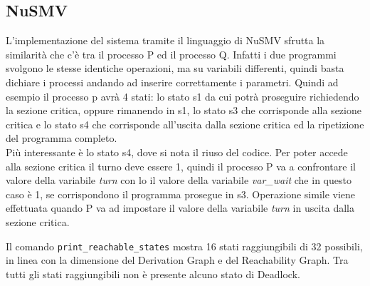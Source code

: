 \documentclass[a4paper]{article}
\begin{document}
\subsection{NuSMV}
L'implementazione del sistema tramite il linguaggio di NuSMV sfrutta la similarità che c'è tra il processo P ed il processo Q.
Infatti i due programmi svolgono le stesse identiche operazioni, ma su variabili differenti, quindi basta dichiare i processi andando ad inserire correttamente i parametri.
Quindi ad esempio il processo p avrà 4 stati: lo stato s1 da cui potrà proseguire richiedendo la sezione critica, oppure rimanendo in s1, lo stato s3 che corrisponde alla sezione critica e lo stato s4 che corrisponde all'uscita dalla sezione critica ed la ripetizione del programma completo.\\
Più interessante è lo stato s4, dove si nota il riuso del codice. 
Per poter accede alla sezione critica il turno deve essere 1, quindi il processo P va a confrontare il valore della variabile \textit{turn} con lo il valore della variabile \textit{var\_wait} che in questo caso è 1, se corrispondono il programma prosegue in s3.
Operazione simile viene effettuata quando P va ad impostare il valore della variabile \textit{turn} in uscita dalla sezione critica.

Il comando \texttt{print\_reachable\_states} mostra 16 stati raggiungibili di 32 possibili, in linea con la dimensione del Derivation Graph e del Reachability Graph.
Tra tutti gli stati raggiungibili non è presente alcuno stato di Deadlock.
\end{document}
